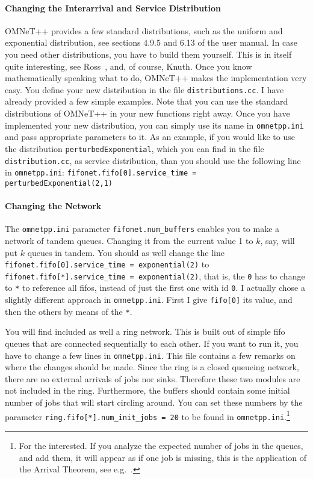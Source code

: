 \documentclass[a4paper]{article}
\begin{document}
\paragraph{Changing the Interarrival and Service Distribution}
\label{sec:chang-inter-serv-1}
OMNeT++ provides a few standard distributions, such as the uniform and
exponential distribution, see sections 4.9.5 and 6.13 of the user
manual. In case you need other distributions, you have to build them
yourself. This is in itself quite interesting, see Ross~\cite{Ross93},
and, of course, Knuth\cite{Knuth97}. Once you know mathematically
speaking what to do, OMNeT++ makes the implementation very easy.  You
define your new distribution in the file \texttt{distributions.cc}. I
have already provided a few simple examples.  Note that you can use
the standard distributions of OMNeT++ in your new functions right
away. Once you have implemented your new distribution, you can simply
use its name in \texttt{omnetpp.ini} and pass appropriate parameters
to it. As an example, if you would like to use the distribution
\texttt{perturbedExponential}, which you can find in the file
\texttt{distribution.cc}, as service distribution, than you should use
the following line in \texttt{omnetpp.ini}:
\texttt{fifonet.fifo[0].service\_time = perturbedExponential(2,1)}

\paragraph{Changing the Network}
\label{sec:changing-network}
The \texttt{omnetpp.ini} parameter \texttt{fifonet.num\_buffers}
enables you to make a network of tandem queues. Changing it from the
current value 1 to $k$, say, will put $k$ queues in tandem. You should
as well change the line \texttt{fifonet.fifo[0].service\_time =
  exponential(2)} to \texttt{fifonet.fifo[*].service\_time =
  exponential(2)}, that is, the \texttt{0} has to change to \texttt{*}
to reference all fifos, instead of just the first one with id
\texttt{0}. I actually chose a slightly different approach in
\texttt{omnetpp.ini}. First I give \texttt{fifo[0]} its value, and
then the others by means of the \texttt{*}.

You will find included as well a ring network. This is built out of
simple fifo queues that are connected sequentially to each other. If
you want to run it, you have to change a few lines in
\texttt{omnetpp.ini}. This file contains a few remarks on where the
changes should be made. Since the ring is a closed queueing network,
there are no external arrivals of jobs nor sinks. Therefore these
two modules are not included in the ring. Furthermore, the buffers
should contain some initial number of jobs that will start circling
around. You can set these numbers by the parameter
\texttt{ring.fifo[*].num\_init\_jobs = 20} to be found in
\texttt{omnetpp.ini}.\footnote{For the interested. If you analyze the
  expected number of jobs in the queues, and add them, it will appear
  as if one job is missing, this is the application of the Arrival
  Theorem, see e.g.~\cite{Ross93}.}
\end{document}
